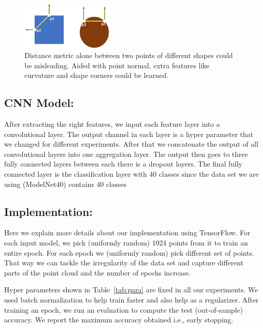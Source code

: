 \begin{figure}[!tbh]
\includegraphics[width=0.4\textwidth]{fig/norm.JPG}
\caption{Distance metric alone between two points of different shapes could be misleading. Aided with point normal, extra features like curvature and shape corners could be learned.}
\label{fig:norm}
\end{figure}

\subsection{CNN Model:}
After extracting the right features, we input each feature layer into a convolutional layer. The output channel in each layer is a hyper parameter that we changed for different experiments. After that we concatenate the output of all convolutional layers into one aggregation layer. The output then goes to three fully connected layers between each there is a dropout layers. The final fully connected layer is the classification layer with 40 classes since the data set we are using (ModelNet40) contains 40 classes 

\subsection{Implementation:}
Here we explain more details about our implementation using TensorFlow. For each input model, we pick (uniformly random) 1024 points from it to train an entire epoch. For each epoch we (uniformly random) pick different set of points. That way we can tackle the irregularity  of the data set and capture different parts of the point cloud and the number of epochs increase. 

Hyper parameters shown in Table~\ref{tab:para} are fixed in all our experiments. We used batch normalization to help train faster and also help as a regularizer. After training an epoch, we run an evaluation to compute the test (out-of-sample) accuracy. We report the maximum accuracy obtained i.e., early stopping. 


